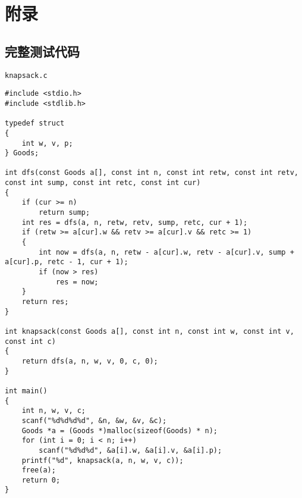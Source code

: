 \documentclass[12pt]{article}
\begin{document}
\newpage

\appendix

\section{附录}

\subsection{完整测试代码}

\texttt{knapsack.c}

{
\setmainfont{Consolas}
\begin{lstlisting}
#include <stdio.h>
#include <stdlib.h>

typedef struct
{
    int w, v, p;
} Goods;

int dfs(const Goods a[], const int n, const int retw, const int retv, const int sump, const int retc, const int cur)
{
    if (cur >= n)
        return sump;
    int res = dfs(a, n, retw, retv, sump, retc, cur + 1);
    if (retw >= a[cur].w && retv >= a[cur].v && retc >= 1)
    {
        int now = dfs(a, n, retw - a[cur].w, retv - a[cur].v, sump + a[cur].p, retc - 1, cur + 1);
        if (now > res)
            res = now;
    }
    return res;
}

int knapsack(const Goods a[], const int n, const int w, const int v, const int c)
{
    return dfs(a, n, w, v, 0, c, 0);
}

int main()
{
    int n, w, v, c;
    scanf("%d%d%d%d", &n, &w, &v, &c);
    Goods *a = (Goods *)malloc(sizeof(Goods) * n);
    for (int i = 0; i < n; i++)
        scanf("%d%d%d", &a[i].w, &a[i].v, &a[i].p);
    printf("%d", knapsack(a, n, w, v, c));
    free(a);
    return 0;
}
\end{lstlisting}
}
\end{document}
